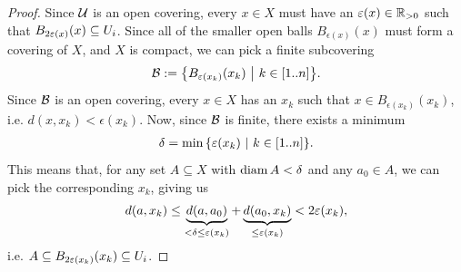 \begin{proof}
	Since $\mathcal{U}$ is an open covering, every $x \in X$ must have an $\varepsilon(x) \in \mathbb{R}_{> 0}$ such that $B_{2\varepsilon(x)}(x) \subseteq U_i$. Since all of the smaller open balls $B_{\epsilon(x)}(x)$ must form a covering of $X$, and $X$ is compact, we can pick a finite subcovering
	\begin{align*}
		\mathcal{B} := \qty{B_{\varepsilon(x_k)}(x_k) ~\middle|~k \in [1..n]}.
	\end{align*}
	Since $\mathcal{B}$ is an open covering, every $x \in X$ has an $x_k$ such that $x \in B_{\epsilon(x_k)}(x_k)$, i.e. $d(x, x_k) < \epsilon(x_k)$.
	\newpar
	Now, since $\mathcal{B}$ is finite, there exists a minimum
	\begin{align*}
		\delta = \min\qty{\varepsilon(x_k) ~\middle|~k \in [1..n]}.
	\end{align*}
	This means that, for any set $A \subseteq X$ with $\operatorname{diam} A < \delta$ and any $a_0 \in A$, we can pick the corresponding $x_k$, giving us
	\begin{align*}
		d(a,x_k) \leq \underbrace{d(a, a_0)}_{< \delta \leq \varepsilon(x_k)} + \underbrace{d(a_0, x_k)}_{\leq \varepsilon(x_k)} < 2\varepsilon(x_k),
	\end{align*}
	i.e. $A \subseteq B_{2\varepsilon(x_k)}(x_k) \subseteq U_i$.
\end{proof}
\clearpage

